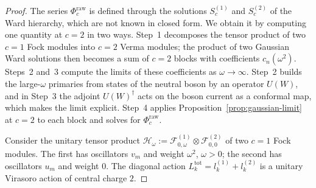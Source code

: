 \documentclass[twoside,10pt]{article}
\numberwithin{equation}{section}
\theoremstyle{slbody}
\theoremstyle{definition}
\theoremstyle{remark}
\begin{document}
\begin{proof}
The series \(\Phi_c^{\mathrm{raw}}\) is defined through the solutions
\(S^{(1)}_c\) and \(S^{(2)}_c\) of the Ward hierarchy, which are not known in
closed form.  We obtain it by computing one quantity at \(c=2\) in two ways.
Step~1 decomposes the tensor product of two \(c=1\) Fock modules into \(c=2\)
Verma modules; the product of two Gaussian Ward solutions then becomes a sum of
\(c=2\) blocks with coefficients \(c_n(\omega^2)\).  Steps~2 and~3 compute the
limits of these coefficients as \(\omega\to\infty\).  Step~2 builds the
large-\(\omega\) primaries from states of the neutral boson by an operator
\(U(W)\), and in Step~3 the adjoint \(U(W)^\dagger\) acts on the boson current
as a conformal map, which makes the limit explicit.  Step~4 applies
Proposition~\ref{prop:gaussian-limit} at \(c=2\) to each block and solves for
\(\Phi_c^{\mathrm{raw}}\).

Consider the unitary tensor product
\(\mathcal H_\omega:=\mathcal F_{0,\omega}^{(1)}\otimes\mathcal F_{0,0}^{(2)}\)
of two \(c=1\) Fock modules.  The first has oscillators \(v_m\) and weight
\(\omega^2\), \(\omega>0\); the second has oscillators \(u_m\) and weight
\(0\).  The diagonal action \(L_k^{\mathrm{tot}}=l_k^{(1)}+l_k^{(2)}\) is a unitary
Virasoro action of central charge \(2\).


\end{proof}
\end{document}
